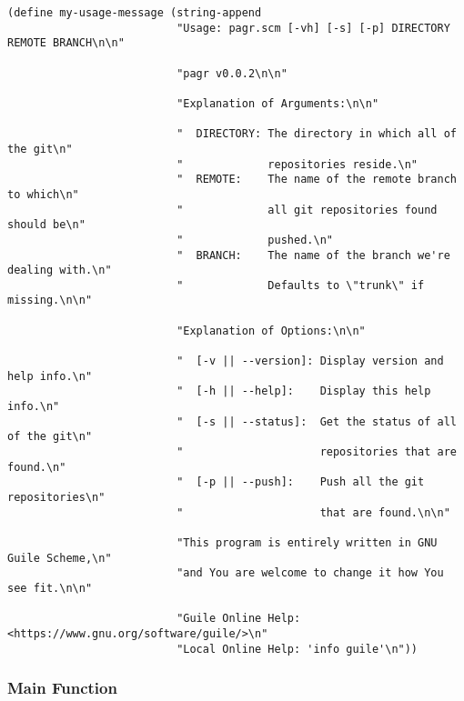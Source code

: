 \documentclass[11pt]{article}
\begin{document}
\begin{verbatim}
(define my-usage-message (string-append
                          "Usage: pagr.scm [-vh] [-s] [-p] DIRECTORY REMOTE BRANCH\n\n"

                          "pagr v0.0.2\n\n"
                          
                          "Explanation of Arguments:\n\n"
                          
                          "  DIRECTORY: The directory in which all of the git\n"
                          "             repositories reside.\n"
                          "  REMOTE:    The name of the remote branch to which\n"
                          "             all git repositories found should be\n"
                          "             pushed.\n"
                          "  BRANCH:    The name of the branch we're dealing with.\n"
                          "             Defaults to \"trunk\" if missing.\n\n"

                          "Explanation of Options:\n\n"

                          "  [-v || --version]: Display version and help info.\n"
                          "  [-h || --help]:    Display this help info.\n"
                          "  [-s || --status]:  Get the status of all of the git\n"
                          "                     repositories that are found.\n"
                          "  [-p || --push]:    Push all the git repositories\n"
                          "                     that are found.\n\n"

                          "This program is entirely written in GNU Guile Scheme,\n"
                          "and You are welcome to change it how You see fit.\n\n"

                          "Guile Online Help: <https://www.gnu.org/software/guile/>\n"
                          "Local Online Help: 'info guile'\n"))
\end{verbatim}

\subsubsection{Main Function}
\label{sec:org894e285}
\end{document}
